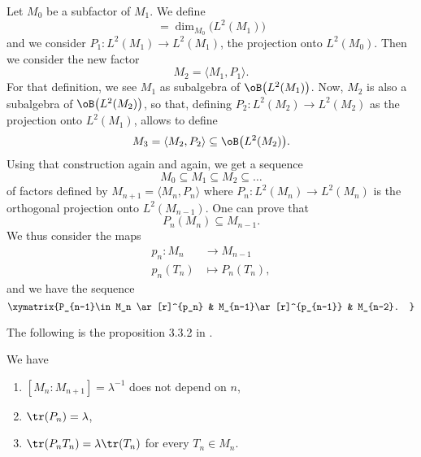 Let $M_0$ be a subfactor of $M_1$. We define 
\begin{equation}
[M_1:M_0]=\dim_{M_0}\big( L^2(M_1) \big)
\end{equation}
and we consider $P_1\colon  L^2(M_1)\to L^2(M_1)$, the projection onto $L^2(M_0)$. Then we consider the new factor
\begin{equation}
	M_2=\langle M_1, P_1\rangle.
\end{equation}
For that definition, we see $M_1$ as subalgebra of $\oB\big( L^2(M_1) \big)$. Now, $M_2$ is also a subalgebra of $\oB\big( L^2(M_2) \big)$, so that, defining $P_2\colon L^2(M_2)\to L^2(M_2)$ as the projection onto $L^2(M_1)$, allows to define
\begin{equation}
	M_3=\langle M_2, P_2\rangle \subseteq\oB\big( L^2(M_2) \big).
\end{equation}
Using that construction again and again, we get a sequence
\begin{equation}
	M_0\subseteq M_1\subseteq M_2\subseteq\ldots
\end{equation}
of factors defined by $M_{n+1}=\langle M_n, P_n\rangle $ where $P_n\colon L^2(M_n)\to L^2(M_n)$ is the orthogonal projection onto $L^2(M_{n-1})$. One can prove that
\begin{equation}
	P_n(M_n)\subseteq M_{n-1}.
\end{equation}
We thus consider the maps
\begin{equation}
\begin{aligned}
 p_n\colon M_n&\to M_{n-1} \\
   p_n(T_n)&\mapsto P_n(T_n),
\end{aligned}
\end{equation}
and we have the sequence
\begin{equation}
\xymatrix{%
   P_{n-1}\in M_n \ar[r]^{p_n}	&	M_{n-1}\ar[r]^{p_{n-1}}	& M_{n-2}.
}
\end{equation}

The following is the proposition 3.3.2 in \cite{JonesSunder}.

\begin{proposition}		\label{ProppropsindexMarkov}
We have
\begin{enumerate}
\item $[M_n:M_{n+1}]=\lambda^{-1}$ does not depend on $n$,
\item $\tr(P_n)=\lambda$,
\item $\tr(P_nT_n)=\lambda\tr(T_n)$ for every $T_n\in M_n$.
\end{enumerate}
\end{proposition}

